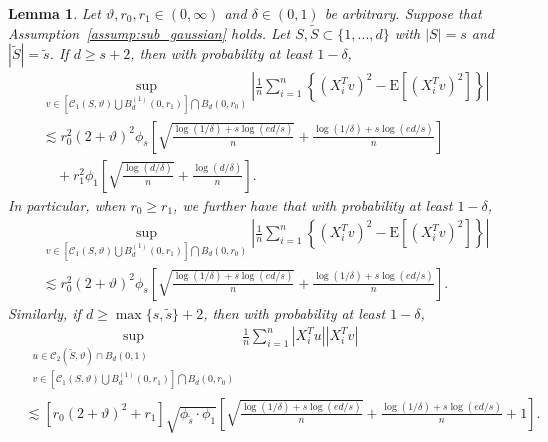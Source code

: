 \documentclass[10pt,a4paper]{amsart}
\theoremstyle{plain}
\newtheorem{lemma}[theorem]{Lemma}
\theoremstyle{remark}
\renewcommand{\tilde}{\widetilde}
\begin{document}
\begin{lemma}
	\label{lem:cone_ball_bnd}
	Let $\vartheta,r_0,r_1 \in (0,\infty)$ and $\delta \in (0,1)$ be arbitrary. Suppose that Assumption~\ref{assump:sub_gaussian} holds. Let $S,\tilde{S}\subset \{1,...,d\}$ with $|S|=s$ and $|\tilde{S}|=\tilde{s}$. If $d\geq s+2$, then with probability at least $1-\delta$,
	\begin{align*}
		&\sup_{v\in \left[\mathcal{C}_1(S,\vartheta) \bigcup B_d^{(1)}(0,r_1) \right] \bigcap B_d(0,r_0)} \left|\frac{1}{n} \sum_{i=1}^n \left\{(X_i^Tv)^2 - \mathrm{E}\left[(X_i^Tv)^2\right] \right\}\right| \\
		&\lesssim r_0^2 (2+\vartheta)^2 \phi_s\left[\sqrt{\frac{\log(1/\delta) + s\log(ed/s)}{n}} + \frac{\log(1/\delta)  + s\log(ed/s)}{n} \right] \\
		&\quad + r_1^2\phi_1 \left[\sqrt{\frac{\log(d/\delta)}{n}} + \frac{\log(d/\delta)}{n}\right].
	\end{align*}
	In particular, when $r_0\geq r_1$, we further have that with probability at least $1-\delta$,
	\begin{align*}
		&\sup_{v\in \left[\mathcal{C}_1(S,\vartheta) \bigcup B_d^{(1)}(0,r_1) \right] \bigcap B_d(0,r_0)} \left|\frac{1}{n} \sum_{i=1}^n \left\{(X_i^Tv)^2 - \mathrm{E}\left[(X_i^Tv)^2\right] \right\}\right| \\
		&\lesssim r_0^2 (2+\vartheta)^2 \phi_s\left[\sqrt{\frac{\log(1/\delta) + s\log(ed/s)}{n}} + \frac{\log(1/\delta)  + s\log(ed/s)}{n} \right].
	\end{align*}
	Similarly, if $d\geq \max\{s,\tilde{s}\} +2$, then with probability at least $1-\delta$,
	\begin{align*}
		&\sup_{\substack{u \in \mathcal{C}_2(\tilde{S},\vartheta) \cap B_d(0,1)\\v\in \left[\mathcal{C}_1(S,\vartheta) \bigcup B_d^{(1)}(0,r_1) \right] \bigcap B_d(0,r_0)}} \frac{1}{n} \sum_{i=1}^n \left|X_i^Tu \right| \left|X_i^Tv \right| \\
		&\lesssim \left[r_0(2+\vartheta)^2+r_1\right] \sqrt{\phi_{\tilde{s}} \cdot \phi_1} \left[\sqrt{\frac{\log(1/\delta) + s\log(ed/s)}{n}} + \frac{\log(1/\delta)  + s\log(ed/s)}{n} + 1\right].
	\end{align*}
\end{lemma}
\end{document}
